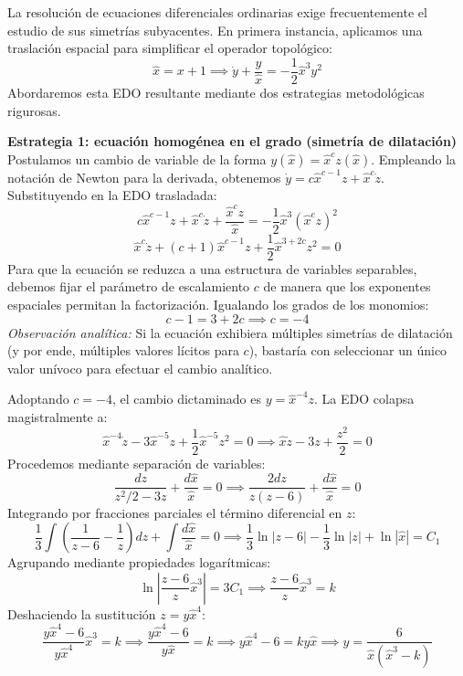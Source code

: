 \begin{tcolorbox}
La resolución de ecuaciones diferenciales ordinarias exige frecuentemente el estudio de sus simetrías subyacentes. En primera instancia, aplicamos una traslación espacial para simplificar el operador topológico:
$$ \hat{x} = x + 1 \implies \dot{y} + \frac{y}{\hat{x}} = -\frac{1}{2}\hat{x}^3 y^2 $$
Abordaremos esta EDO resultante mediante dos estrategias metodológicas rigurosas.

\textbf{Estrategia 1: ecuación homogénea en el grado (simetría de dilatación)} \\
Postulamos un cambio de variable de la forma $y(\hat{x}) = \hat{x}^c z(\hat{x})$. Empleando la notación de Newton para la derivada, obtenemos $\dot{y} = c\hat{x}^{c-1}z + \hat{x}^c \dot{z}$.
Substituyendo en la EDO trasladada:
$$ c\hat{x}^{c-1}z + \hat{x}^c \dot{z} + \frac{\hat{x}^c z}{\hat{x}} = -\frac{1}{2}\hat{x}^3 (\hat{x}^c z)^2 $$
$$ \hat{x}^c \dot{z} + (c+1)\hat{x}^{c-1}z + \frac{1}{2}\hat{x}^{3+2c}z^2 = 0 $$
Para que la ecuación se reduzca a una estructura de variables separables, debemos fijar el parámetro de escalamiento $c$ de manera que los exponentes espaciales permitan la factorización. Igualando los grados de los monomios:
$$ c - 1 = 3 + 2c \implies c = -4 $$
\textit{Observación analítica:} Si la ecuación exhibiera múltiples simetrías de dilatación (y por ende, múltiples valores lícitos para $c$), bastaría con seleccionar un único valor unívoco para efectuar el cambio analítico.

Adoptando $c = -4$, el cambio dictaminado es $y = \hat{x}^{-4}z$. La EDO colapsa magistralmente a:
$$ \hat{x}^{-4}\dot{z} - 3\hat{x}^{-5}z + \frac{1}{2}\hat{x}^{-5}z^2 = 0 \implies \hat{x}\dot{z} - 3z + \frac{z^2}{2} = 0 $$
Procedemos mediante separación de variables:
$$ \frac{dz}{z^2/2 - 3z} + \frac{d\hat{x}}{\hat{x}} = 0 \implies \frac{2dz}{z(z-6)} + \frac{d\hat{x}}{\hat{x}} = 0 $$
Integrando por fracciones parciales el término diferencial en $z$:
$$ \frac{1}{3}\int \left( \frac{1}{z-6} - \frac{1}{z} \right) dz + \int \frac{d\hat{x}}{\hat{x}} = 0 \implies \frac{1}{3}\ln|z-6| - \frac{1}{3}\ln|z| + \ln|\hat{x}| = C_1 $$
Agrupando mediante propiedades logarítmicas:
$$ \ln\left| \frac{z-6}{z} \hat{x}^3 \right| = 3C_1 \implies \frac{z-6}{z}\hat{x}^3 = k $$
Deshaciendo la sustitución $z = y\hat{x}^4$:
$$ \frac{y\hat{x}^4 - 6}{y\hat{x}^4}\hat{x}^3 = k \implies \frac{y\hat{x}^4 - 6}{y\hat{x}} = k \implies y\hat{x}^4 - 6 = ky\hat{x} \implies y = \frac{6}{\hat{x}(\hat{x}^3 - k)} $$


\end{tcolorbox}
